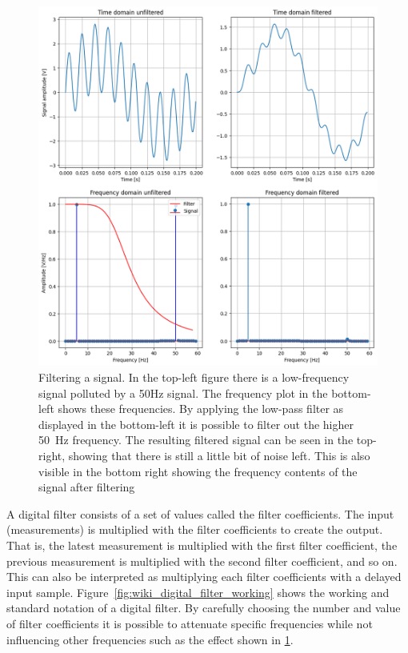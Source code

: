 \begin{figure}[h!t]
	\begin{center}
		\includegraphics[width=1.0\columnwidth]{images/filter_example.png}
	\end{center}
	\caption{Filtering a signal. In the top-left figure there is a low-frequency signal polluted by a 50Hz signal. The frequency plot in the bottom-left shows these frequencies. By applying the low-pass filter as displayed in the bottom-left it is possible to filter out the higher \SI{50}{\hertz} frequency. The resulting filtered signal can be seen in the top-right, showing that there is still a little bit of noise left. This is also visible in the bottom right showing the frequency contents of the signal after filtering}
	\label{fig:filter_example}
\end{figure}

A digital filter consists of a set of values called the filter coefficients. The input (measurements) is multiplied with the filter coefficients to create the output. That is, the latest measurement is multiplied with the first filter coefficient, the previous measurement is multiplied with the second filter coefficient, and so on. This can also be interpreted as multiplying each filter coefficients with a delayed input sample. Figure~\ref{fig:wiki_digital_filter_working} shows the working and standard notation of a digital filter.
By carefully choosing the number and value of filter coefficients it is possible to attenuate specific frequencies while not influencing other frequencies such as the effect shown in \ref{fig:filter_example}. 

